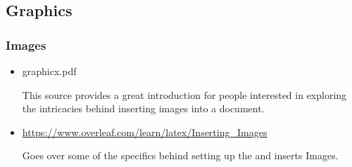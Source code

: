 	\subsection{Graphics}
		\subsubsection{Images}
			\begin{itemize}
				\item graphicx.pdf
					\begin{absquote}
						This source provides a great introduction for people interested in exploring the intricacies behind inserting images into a document.
					\end{absquote}
				\item \url{https://www.overleaf.com/learn/latex/Inserting_Images}
					\begin{absquote}
						Goes over some of the specifics behind setting up the  and inserts Images.
					\end{absquote}
			\end{itemize}
